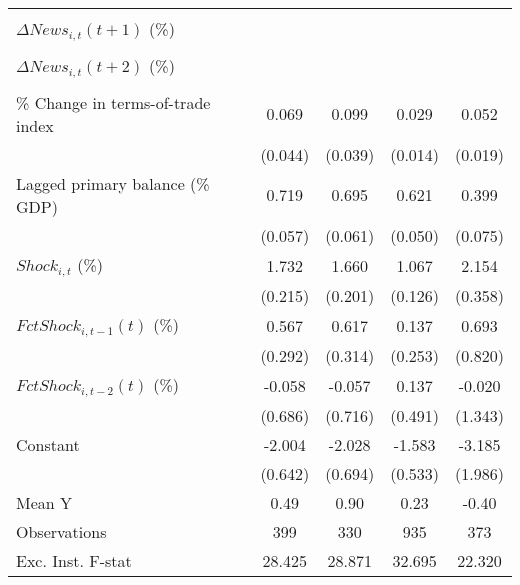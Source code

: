 {\begin{tabular}{l*{4}{c}}
                    &                     &                     &                     &                     \\
\addlinespace
$ \Delta News_{i,t}(t+1)$ (\%)&                     &                     &                     &                     \\
                    &                     &                     &                     &                     \\
\addlinespace
$ \Delta News_{i,t}(t+2)$ (\%)&                     &                     &                     &                     \\
                    &                     &                     &                     &                     \\
\addlinespace
\% Change in terms-of-trade index&       0.069         &       0.099\sym{**} &       0.029\sym{**} &       0.052\sym{**} \\
                    &     (0.044)         &     (0.039)         &     (0.014)         &     (0.019)         \\
\addlinespace
Lagged primary balance (\% GDP)&       0.719\sym{***}&       0.695\sym{***}&       0.621\sym{***}&       0.399\sym{***}\\
                    &     (0.057)         &     (0.061)         &     (0.050)         &     (0.075)         \\
\addlinespace
$ Shock_{i,t}$ (\%) &       1.732\sym{***}&       1.660\sym{***}&       1.067\sym{***}&       2.154\sym{***}\\
                    &     (0.215)         &     (0.201)         &     (0.126)         &     (0.358)         \\
\addlinespace
$ FctShock_{i,t-1}(t)$ (\%)&       0.567\sym{*}  &       0.617\sym{*}  &       0.137         &       0.693         \\
                    &     (0.292)         &     (0.314)         &     (0.253)         &     (0.820)         \\
\addlinespace
$ FctShock_{i,t-2}(t)$ (\%)&      -0.058         &      -0.057         &       0.137         &      -0.020         \\
                    &     (0.686)         &     (0.716)         &     (0.491)         &     (1.343)         \\
\addlinespace
Constant            &      -2.004\sym{***}&      -2.028\sym{***}&      -1.583\sym{***}&      -3.185         \\
                    &     (0.642)         &     (0.694)         &     (0.533)         &     (1.986)         \\
\midrule
Mean Y              &        0.49         &        0.90         &        0.23         &       -0.40         \\
Observations        &         399         &         330         &         935         &         373         \\
Exc. Inst. F-stat   &      28.425         &      28.871         &      32.695         &      22.320         \\
\bottomrule
\end{tabular}
}
